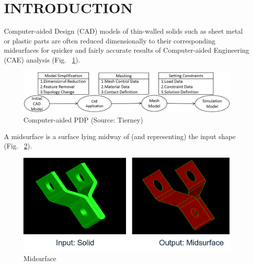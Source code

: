 \documentclass[9pt,academicons]{article}
\begin{document}
%






\section{INTRODUCTION}
Computer-aided Design (CAD) models of thin-walled solids such as sheet metal or plastic parts are often reduced dimensionally to their corresponding midsurfaces for quicker and fairly accurate results of Computer-aided Engineering (CAE) analysis (Fig. ~\ref{fig_cadcaeworkflow}).  

	\begin{figure} [!h]
		\centering
		\includegraphics[width=\linewidth,keepaspectratio]{images/midcurve2}
		\caption{Computer-aided PDP (Source: Tierney\cite{Tierney2013})}
		\label{fig_cadcaeworkflow}
	\end{figure}
	

A midsurface is a surface lying midway of (and representing) the input shape (Fig. ~\ref{fig_midsurface}).  

	\begin{figure} [!h]
		\centering
		\includegraphics[width=0.8\linewidth,keepaspectratio]{images/midcurve5}
		\caption{Midsurface}
		\label{fig_midsurface}
	\end{figure}
\end{document}
